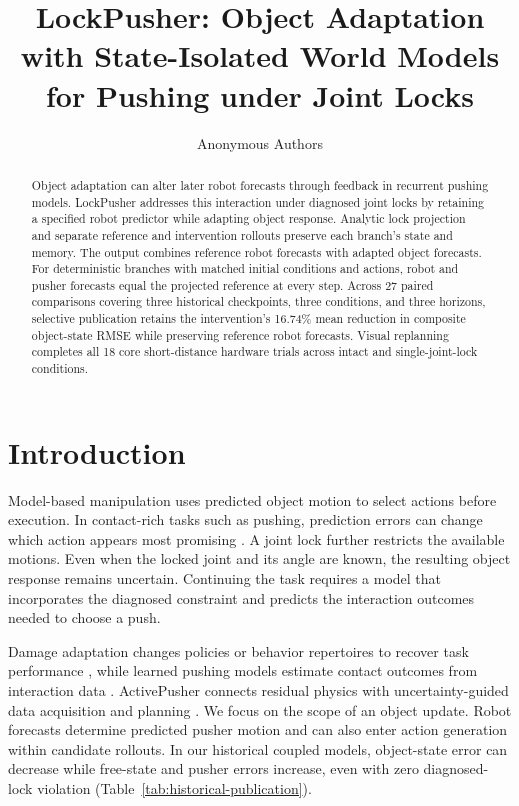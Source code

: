 \documentclass[conference]{IEEEtran}
\title{LockPusher: Object Adaptation with State-Isolated World Models for Pushing under Joint Locks}
\author{Anonymous Authors}
\begin{document}
\maketitle
\begin{abstract}
Object adaptation can alter later robot forecasts through feedback in recurrent pushing models. LockPusher addresses this interaction under diagnosed joint locks by retaining a specified robot predictor while adapting object response. Analytic lock projection and separate reference and intervention rollouts preserve each branch's state and memory. The output combines reference robot forecasts with adapted object forecasts. For deterministic branches with matched initial conditions and actions, robot and pusher forecasts equal the projected reference at every step. Across 27 paired comparisons covering three historical checkpoints, three conditions, and three horizons, selective publication retains the intervention's 16.74\% mean reduction in composite object-state RMSE while preserving reference robot forecasts. Visual replanning completes all 18 core short-distance hardware trials across intact and single-joint-lock conditions.
\end{abstract}

\section{Introduction}
Model-based manipulation uses predicted object motion to select actions before execution. In contact-rich tasks such as pushing, prediction errors can change which action appears most promising \cite{finn2017visual,bauza2018data}. A joint lock further restricts the available motions. Even when the locked joint and its angle are known, the resulting object response remains uncertain. Continuing the task requires a model that incorporates the diagnosed constraint and predicts the interaction outcomes needed to choose a push.

Damage adaptation changes policies or behavior repertoires to recover task performance \cite{cully2015robots,yang2021fault}, while learned pushing models estimate contact outcomes from interaction data \cite{bauza2018data,kim2023se2}. ActivePusher connects residual physics with uncertainty-guided data acquisition and planning \cite{zhong2026activepusher}. We focus on the scope of an object update. Robot forecasts determine predicted pusher motion and can also enter action generation within candidate rollouts. In our historical coupled models, object-state error can decrease while free-state and pusher errors increase, even with zero diagnosed-lock violation (Table~\ref{tab:historical-publication}).
\end{document}
